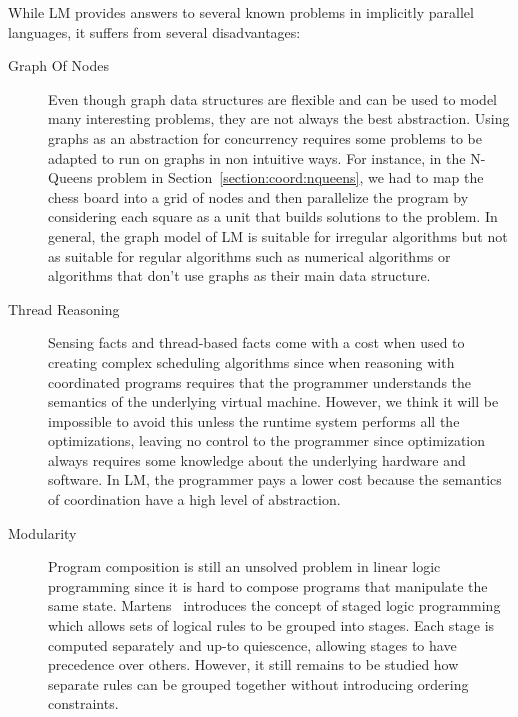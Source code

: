 While LM provides answers to several known problems in implicitly parallel
languages, it suffers from several disadvantages:

\begin{description}

   \item[Graph Of Nodes] Even though graph data structures are flexible and can
      be used to model many interesting problems, they are not always the best
      abstraction. Using graphs as an abstraction for concurrency requires
      some problems to be adapted to run on graphs in non intuitive
      ways. For instance, in the N-Queens problem in
      Section~\ref{section:coord:nqueens}, we had to map the chess board
      into a grid of nodes and then parallelize the program by considering each
      square as a unit that builds solutions to the problem. In general, the
      graph model of LM is suitable for irregular algorithms but not as suitable
      for regular algorithms such as numerical algorithms or algorithms that
      don't use graphs as their main data structure.

   \item[Thread Reasoning] Sensing facts and thread-based facts come with a cost
      when used to creating complex scheduling algorithms since when reasoning
      with coordinated programs requires that the programmer understands the
      semantics of the underlying virtual machine. However, we think it will be
      impossible to avoid this unless the runtime system performs all the
      optimizations, leaving no control to the programmer since optimization
      always requires some knowledge about the underlying hardware and software.
      In LM, the programmer pays a lower cost because the semantics of
      coordination have a high level of abstraction.

   \item[Modularity] Program composition is still an unsolved problem in linear
      logic programming since it is hard to compose programs that manipulate the
      same state. Martens~\cite{chris-thesis} introduces the concept of staged
      logic programming which allows sets of logical rules to be grouped into
      stages. Each stage is computed separately and up-to quiescence, allowing
      stages to have precedence over others. However, it still remains to be
      studied how separate rules can be grouped together without introducing
      ordering constraints.

\end{description}

